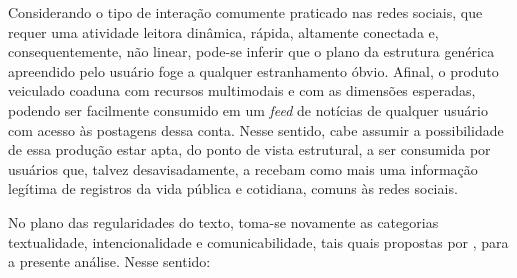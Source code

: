 \documentclass[portuguese]{textolivre}
\begin{document}
Considerando o tipo de interação comumente praticado nas redes sociais, que requer uma atividade leitora dinâmica, rápida, altamente conectada e, consequentemente, não linear, pode-se inferir que o plano da estrutura genérica apreendido pelo usuário foge a qualquer estranhamento óbvio. Afinal, o produto veiculado coaduna com recursos multimodais e com as dimensões esperadas, podendo ser facilmente consumido em um \textit{feed} de notícias de qualquer usuário com acesso às postagens dessa conta. Nesse sentido, cabe assumir a possibilidade de essa produção estar apta, do ponto de vista estrutural, a ser consumida por usuários que, talvez desavisadamente, a recebam como mais uma informação legítima de registros da vida pública e cotidiana, comuns às redes sociais.

No plano das regularidades do texto, toma-se novamente as categorias textualidade, intencionalidade e comunicabilidade, tais quais propostas por \textcite{antunes2017textualidade}, para a presente análise. Nesse sentido:
\end{document}
